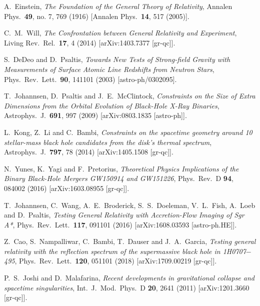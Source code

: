 \documentclass[11pt,a4paper,pdftex]{article}
\begin{document}



\begin{thebibliography}{99}

  A.~Einstein,
  {\it The Foundation of the General Theory of Relativity},
  Annalen Phys.\  {\bf 49}, no. 7, 769 (1916)
  [Annalen Phys.\  {\bf 14}, 517 (2005)].

  C.~M.~Will,
  {\it The Confrontation between General Relativity and Experiment},
  Living Rev.\ Rel.\  {\bf 17}, 4 (2014)
  [arXiv:1403.7377 [gr-qc]]. 
  
  S.~DeDeo and D.~Psaltis,
  {\it Towards New Tests of Strong-field Gravity with Measurements of Surface Atomic Line Redshifts from Neutron Stars},
  Phys.\ Rev.\ Lett.\  {\bf 90}, 141101 (2003)
  [astro-ph/0302095].  
  
  T.~Johannsen, D.~Psaltis and J.~E.~McClintock,
  {\it Constraints on the Size of Extra Dimensions from the Orbital Evolution of Black-Hole X-Ray Binaries},
  Astrophys.\ J.\  {\bf 691}, 997 (2009)
  [arXiv:0803.1835 [astro-ph]]. 
  
  L.~Kong, Z.~Li and C.~Bambi,
  {\it Constraints on the spacetime geometry around 10 stellar-mass black hole candidates from the disk's thermal spectrum},
  Astrophys.\ J.\  {\bf 797}, 78 (2014)
  [arXiv:1405.1508 [gr-qc]].   
  
  N.~Yunes, K.~Yagi and F.~Pretorius,
  {\it Theoretical Physics Implications of the Binary Black-Hole Mergers GW150914 and GW151226},
  Phys.\ Rev.\ D {\bf 94}, 084002 (2016)
  [arXiv:1603.08955 [gr-qc]].   
  
  T.~Johannsen, C.~Wang, A.~E.~Broderick, S.~S.~Doeleman, V.~L.~Fish, A.~Loeb and D.~Psaltis,
  {\it Testing General Relativity with Accretion-Flow Imaging of Sgr A*},
  Phys.\ Rev.\ Lett.\  {\bf 117}, 091101 (2016)
  [arXiv:1608.03593 [astro-ph.HE]].

  Z.~Cao, S.~Nampalliwar, C.~Bambi, T.~Dauser and J.~A.~Garcia,
  {\it Testing general relativity with the reflection spectrum of the supermassive black hole in 1H0707$-$495},
  Phys.\ Rev.\ Lett.\  {\bf 120}, 051101 (2018)
  [arXiv:1709.00219 [gr-qc]].
  
  P.~S.~Joshi and D.~Malafarina,
  {\it Recent developments in gravitational collapse and spacetime singularities},
  Int.\ J.\ Mod.\ Phys.\ D {\bf 20}, 2641 (2011)
  [arXiv:1201.3660 [gr-qc]].    
  

\end{thebibliography}
\end{document}
